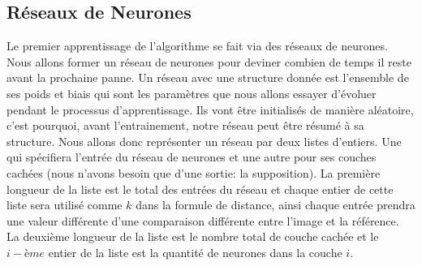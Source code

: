 \documentclass[10pt,a4paper,oneside]{article}
\begin{document}
\begin{multicols}{2}
\subsection{Réseaux de Neurones}
Le premier apprentissage de l'algorithme se fait via des réseaux de neurones. Nous allons former un réseau de neurones pour deviner combien de temps il reste avant la prochaine panne. Un réseau avec une structure donnée est l'ensemble de ses poids et biais qui sont les paramètres que nous allons essayer d'évoluer pendant le processus d'apprentissage. Ils vont être initialisés de manière aléatoire, c'est pourquoi, avant l'entrainement, notre réseau peut être résumé à sa structure. Nous allons donc représenter un réseau par deux listes d'entiers. Une qui spécifiera l’entrée du réseau de neurones et une autre pour ses couches cachées (nous n’avons besoin que d’une sortie: la supposition). La première longueur de la liste est le total des entrées du réseau et chaque entier de cette liste sera utilisé comme $k$ dans la formule de distance, ainsi chaque entrée prendra une valeur différente d'une comparaison différente entre l'image et la référence. La deuxième longueur de la liste est le nombre total de couche cachée et le $i-ème$ entier de la liste est la quantité de neurones dans la couche $i$.

\end{multicols}

\vspace{0.8cm}
\end{document}
